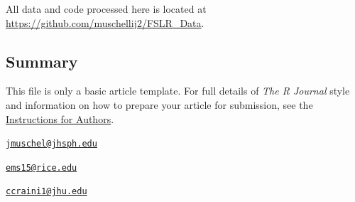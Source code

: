All data and code processed here is located at
\url{https://github.com/muschellij2/FSLR_Data}.

\subsection{Summary}\label{summary}

This file is only a basic article template. For full details of
\emph{The R Journal} style and information on how to prepare your
article for submission, see the
\href{https://journal.r-project.org/share/author-guide.pdf}{Instructions
for Authors}. 

\address{%
John Muschelli\\
Johns Hopkins Bloomberg School of Public Health\\
Department of Biostatistics\\ 615 N Wolfe St, Baltimore, MD, 21205\\
}
\href{mailto:jmuschel@jhsph.edu}{\nolinkurl{jmuschel@jhsph.edu}}

\address{%
Elizabeth M. Sweeney\\
Rice University\\
Department of Statistics\\ 6100 Main St, Duncan Hall, Houston, TX, 77005\\
}
\href{mailto:ems15@rice.edu}{\nolinkurl{ems15@rice.edu}}

\address{%
Ciprian M. Crainiceanu\\
Johns Hopkins Bloomberg School of Public Health\\
Department of Biostatistics\\ 615 N Wolfe St, Baltimore, MD, 21205\\
}
\href{mailto:ccraini1@jhu.edu}{\nolinkurl{ccraini1@jhu.edu}}

